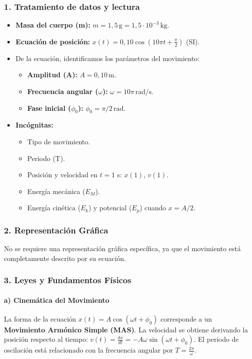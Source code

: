 \subsubsection*{1. Tratamiento de datos y lectura}
\begin{itemize}
    \item \textbf{Masa del cuerpo (m):} $m = 1,5 \, \text{g} = 1,5 \cdot 10^{-3} \, \text{kg}$.
    \item \textbf{Ecuación de posición:} $x(t)=0,10 \cos(10\pi t+\frac{\pi}{2})$ (SI).
    \item De la ecuación, identificamos los parámetros del movimiento:
    \begin{itemize}
        \item \textbf{Amplitud (A):} $A = 0,10 \, \text{m}$.
        \item \textbf{Frecuencia angular ($\omega$):} $\omega = 10\pi \, \text{rad/s}$.
        \item \textbf{Fase inicial ($\phi_0$):} $\phi_0 = \pi/2 \, \text{rad}$.
    \end{itemize}
    \item \textbf{Incógnitas:}
    \begin{itemize}
        \item Tipo de movimiento.
        \item Periodo (T).
        \item Posición y velocidad en $t=1$ s: $x(1)$, $v(1)$.
        \item Energía mecánica ($E_M$).
        \item Energía cinética ($E_k$) y potencial ($E_p$) cuando $x = A/2$.
    \end{itemize}
\end{itemize}

\subsubsection*{2. Representación Gráfica}
No se requiere una representación gráfica específica, ya que el movimiento está completamente descrito por su ecuación.

\subsubsection*{3. Leyes y Fundamentos Físicos}
\paragraph*{a) Cinemática del Movimiento}
La forma de la ecuación $x(t) = A \cos(\omega t + \phi_0)$ corresponde a un \textbf{Movimiento Armónico Simple (MAS)}.
La velocidad se obtiene derivando la posición respecto al tiempo: $v(t) = \frac{dx}{dt} = -A\omega \sin(\omega t + \phi_0)$.
El periodo de oscilación está relacionado con la frecuencia angular por $T = \frac{2\pi}{\omega}$.

